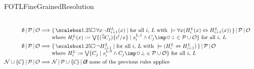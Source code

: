 \begin{entry}{FOTLFineGrainedResolution}
\begin{calculus}
\begin{align*}
\\
\ProverState{\emptyset}{\ProcessedSet}{\OldSet}
&\Longrightarrow
\begin{array}[t]{@{}l@{}}
\ProverState{%
\Set{\Always \forall x \neg H_{i+1}^L(x)}{\mbox{for all $i$,
$L$ with } \models \forall x (H_i^L(x) \Leftrightarrow H_{i+1}^L(x))}%
}{\ProcessedSet}{\OldSet}\\
\mbox{where }
H_i^L(x) := \bigvee \predset{(\existentialClosure C_j)\{c^l /
x\}}{s_i^{L,1}\land C_j\imp\Next\bot\in \ProcessedSet \cup \OldSet}
\mbox{ for all $i$, $L$}
\end{array}
\\
\ProverState{\emptyset}{\ProcessedSet}{\OldSet}
&\Longrightarrow
\begin{array}[t]{@{}l@{}}
\ProverState{%
\Set{\Always \neg H_{i+1}^L}{\mbox{for all $i$,
$L$ with } \models (H_i^L \Leftrightarrow H_{i+1}^L)}%
}{\ProcessedSet}{\OldSet}\\
\mbox{where }
H_i^L := \bigvee 
\predset{C_j}{s_i^{L,0}\land C_j\imp\Next\bot\in \ProcessedSet \cup \OldSet}
\mbox{ for all $i$, $L$}
\end{array}
\\
%
\ProverState{\NewSet \cup \SetEnum{\mathcal{C}}}{\ProcessedSet}{\OldSet}
&\Longrightarrow
\makebox[56pt][l]{$\ProverState{\NewSet}{\ProcessedSet\cup\SetEnum{\mathcal{C}}}{\OldSet}$}
\mbox{ if none of the previous rules applies}
\end{align*}
\end{calculus}


\end{entry}
